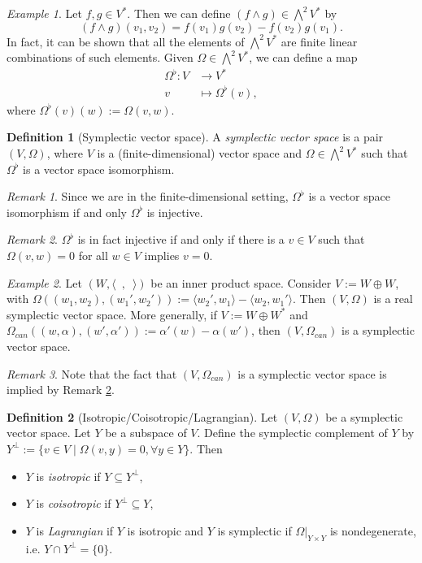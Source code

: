 \documentclass[11pt]{amsart}
\numberwithin{equation}{section}
\theoremstyle{plain}
\theoremstyle{definition}
\newtheorem{defn}{Definition}[subsection]
\theoremstyle{remark}
\newtheorem{rem}{Remark}[subsection]
\newtheorem{ex}{Example}[subsection]
\begin{document}
\begin{ex}
Let $f,g\in V^*$. Then we can define $(f\land g)\in \bigwedge^2 V^*$ by 
\[
(f\land g)(v_1,v_2)=f(v_1)g(v_2)-f(v_2)g(v_1).
\]
In fact, it can be shown that all the elements of $\bigwedge^2V^*$ are finite linear combinations of such elements. Given $\Omega\in \bigwedge^2 V^*$, we can define a map
\begin{align*}
\Omega^\flat\colon V&\to V^*\\
v&\mapsto \Omega^\flat(v),
\end{align*}
where $\Omega^\flat(v)(w):=\Omega(v,w)$.
\end{ex}

\begin{defn}[Symplectic vector space]
A \emph{symplectic vector space} is a pair $(V,\Omega)$, where $V$ is a (finite-dimensional) vector space and $\Omega\in\bigwedge^2 V^*$ such that $\Omega^\flat$ is a vector space isomorphism.
\end{defn}

\begin{rem}
Since we are in the finite-dimensional setting, $\Omega^\flat$ is a vector space isomorphism if and only $\Omega^\flat$ is injective.
\end{rem}

\begin{rem}
\label{rem1}
$\Omega^\flat$ is in fact injective if and only if there is a $v\in V$ such that $\Omega(v,w)=0$ for all $w\in V$ implies $v=0$.
\end{rem}

\begin{ex}
Let $(W,\langle\enspace,\enspace\rangle)$ be an inner product space. Consider $V:=W\oplus W$, with $\Omega((w_1,w_2),(w_1',w_2')):=\langle w_2',w_1\rangle-\langle w_2,w_1'\rangle$. Then $(V,\Omega)$ is a real symplectic vector space. More generally, if $V:=W\oplus W^*$ and $\Omega_{can}((w,\alpha),(w',\alpha')):=\alpha'(w)-\alpha(w')$, then $(V,\Omega_{can})$ is a symplectic vector space.
\end{ex}

\begin{rem}
Note that the fact that $(V,\Omega_{can})$ is a symplectic vector space is implied by Remark \ref{rem1}.
\end{rem}


\begin{defn}[Isotropic/Coisotropic/Lagrangian]
Let $(V,\Omega)$ be a symplectic vector space. Let $Y$ be a subspace of $V$. Define the symplectic complement of $Y$ by $Y^{\perp}:=\{v\in V\mid \Omega(v,y)=0,\forall y\in Y\}$. Then 
\begin{itemize}
\item{$Y$ is \emph{isotropic} if $Y\subseteq Y^\perp$,
}
\item{$Y$ is \emph{coisotropic} if $Y^\perp\subseteq Y$,}
\item{$Y$ is \emph{Lagrangian} if $Y$ is isotropic and $Y$ is symplectic if $\Omega\big|_{Y\times Y}$ is nondegenerate, i.e. $Y\cap Y^\perp=\{0\}$.}
\end{itemize}
\end{defn}
\end{document}
